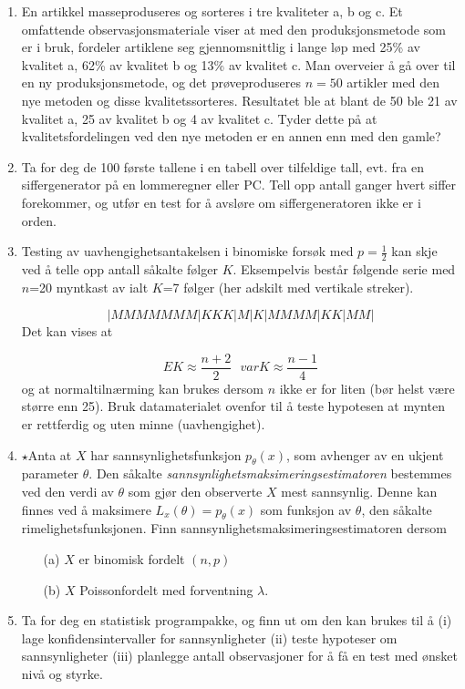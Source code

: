 \begin{enumerate}
\item En artikkel masseproduseres og sorteres i tre kvaliteter a,
b og c. Et omfattende observasjonsmateriale viser at med den
produksjonsmetode som er i bruk, fordeler artiklene seg
gjennomsnittlig i lange løp med 25\% av kvalitet a, 62\% av
kvalitet b og 13\% av kvalitet c. Man overveier å gå over til
en ny produksjonsmetode, og det prøveproduseres $n=50$
artikler med den nye metoden og disse kvalitetssorteres.
Resultatet ble at blant de 50 ble 21 av kvalitet a, 25 av
kvalitet b og 4 av kvalitet c. Tyder dette på at
kvalitetsfordelingen ved den nye metoden er en annen enn med
den gamle?

\item Ta for deg de 100 første tallene i en tabell over tilfeldige
tall, evt. fra en siffergenerator på en lommeregner eller PC. Tell opp
antall ganger hvert siffer forekommer, og utfør en test for
å avsløre om siffergeneratoren ikke er i orden.

\item Testing av uavhengighetsantakelsen i binomiske forsøk med 
$p = \frac{1}{2}$ kan skje ved å telle opp antall såkalte følger
 $K$. Eksempelvis består følgende serie med $n$=20 myntkast av
ialt $K$=7 følger (her adskilt med vertikale streker).

\[ |MMMMMMM|KKK|M|K|MMMM|KK|MM|      \]
Det kan vises at

\[ EK\approx \frac{n+2}{2} \mbox{\ \ \ } varK\approx \frac{n-1}{4} \]
og at normaltilnærming kan brukes dersom $n$ ikke er for liten
(bør helst være større enn 25).
  Bruk datamaterialet ovenfor til å teste
hypotesen at mynten er rettferdig og uten minne (uavhengighet).

\item $\star$Anta at $X$ har sannsynlighetsfunksjon $p_{\theta}(x)$,
 som avhenger av en ukjent parameter  $\theta$.  Den såkalte 
{\em sannsynlighetsmaksimeringsestimatoren} be\-stem\-mes ved den verdi av
$\theta$ som gjør den observerte $X$ mest sannsynlig.  Denne kan finnes
ved å maksimere $L_x (\theta) = p_{\theta}(x)$ som funksjon av $\theta$,
den såkalte rimelighetsfunksjonen.
Finn sannsynlighetsmaksimeringsestimatoren dersom 
\begin{itemize}
\item[(a)] $X$ er binomisk fordelt $(n,p)$
\item[(b)] $X$ Poissonfordelt med forventning $\lambda$.
\end{itemize}

\item Ta for deg en statistisk programpakke, og finn ut om den kan
brukes til å (i) lage konfidensintervaller for
sannsynligheter (ii) teste hypoteser om sannsynligheter (iii) planlegge antall
observasjoner for å få en test med ønsket nivå og styrke.

\end{enumerate}

\normalsize
